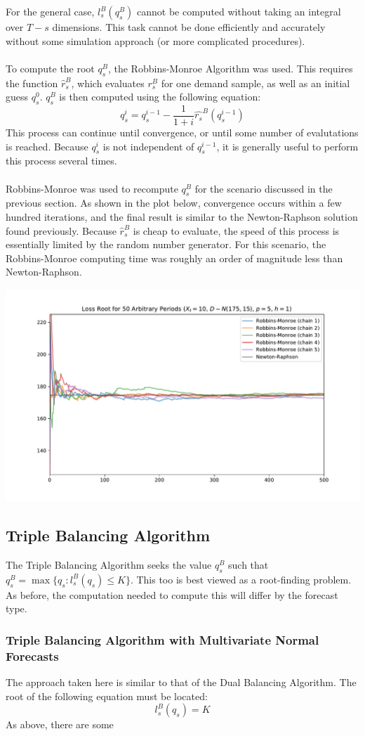 \documentclass[12pt]{report}
\begin{document}
For the general case, $l_s^B(q_s^B)$ cannot be computed without taking an integral over $T-s$ dimensions. This task cannot be done efficiently and accurately without some simulation approach (or more complicated procedures). \\
\\
To compute the root $q_s^B$, the Robbins-Monroe Algorithm was used. This requires the function $\hat{r}_s^B$, which evaluates $r_s^B$ for one demand sample, as well as an initial guess $q_s^0$. $q_s^B$ is then computed using the following equation:
$$
	q_s^i = q_s^{i-1} - \frac{1}{1 + i} \hat{r_s}^B(q_s^{i-1})
$$
This process can continue until convergence, or until some number of evalutations is reached. Because $q_s^i$ is not independent of $q_s^{i-1}$, it is generally useful to perform this process several times.\\
\\
Robbins-Monroe was used to recompute $q_s^B$ for the scenario discussed in the previous section. As shown in the plot below, convergence occurs within a few hundred iterations, and the final result is similar to the Newton-Raphson solution found previously. Because $\hat{r}_s^B$ is cheap to evaluate, the speed of this process is essentially limited by the random number generator. For this scenario, the Robbins-Monroe computing time was roughly an order of magnitude less than Newton-Raphson. 

\includegraphics[width=\textwidth]{rbtraces}

\subsection{Triple Balancing Algorithm}

The Triple Balancing Algorithm seeks the value $q_s^B$ such that $q_s^B = \max\{q_s : l_s^B(q_s) \leq K\}$. This too is best viewed as a root-finding problem. As before, the computation needed to compute this will differ by the forecast type. 

\subsubsection{Triple Balancing Algorithm with Multivariate Normal Forecasts}

The approach taken here is similar to that of the Dual Balancing Algorithm. The root of the following equation must be located:
$$
	l_s^B(q_s) = K
$$ 
As above, there are some 
\end{document}
